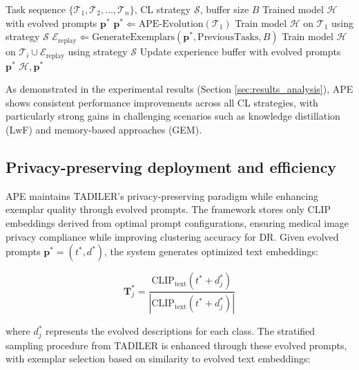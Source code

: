 \documentclass[pdflatex,sn-mathphys-num]{sn-jnl}%
\theoremstyle{thmstyleone}%
\theoremstyle{thmstyletwo}%
\theoremstyle{thmstylethree}%
\begin{document}
\begin{algorithm}
\caption{APE-Enhanced CL Integration}\label{alg:ape_continual_learning}
\begin{algorithmic}[1]
\Require Task sequence $\{\mathcal{T}_1, \mathcal{T}_2, \ldots, \mathcal{T}_n\}$, CL strategy $\mathcal{S}$, buffer size $B$
\Ensure Trained model $\mathcal{H}$ with evolved prompts $\mathbf{p}^*$
\State $\mathbf{p}^* \Leftarrow \text{APE-Evolution}(\mathcal{T}_1)$ 
        \State Train model $\mathcal{H}$ on $\mathcal{T}_1$ using strategy $\mathcal{S}$
    \Else
        \State $\mathcal{E}_{\text{replay}} \Leftarrow \text{GenerateExemplars}(\mathbf{p}^*, \text{PreviousTasks}, B)$
        \State Train model $\mathcal{H}$ on $\mathcal{T}_i \cup \mathcal{E}_{\text{replay}}$ using strategy $\mathcal{S}$
    \EndIf
    \State Update experience buffer with evolved prompts $\mathbf{p}^*$
\EndFor
\State \Return $\mathcal{H}, \mathbf{p}^*$
\end{algorithmic}
\end{algorithm}

As demonstrated in the experimental results (Section \ref{sec:results_analysis}), APE shows consistent performance improvements across all CL strategies, with particularly strong gains in challenging scenarios such as knowledge distillation (LwF) and memory-based approaches (GEM).

\subsection{Privacy-preserving deployment and efficiency}
APE maintains TADILER's privacy-preserving paradigm while enhancing exemplar quality through evolved prompts. The framework stores only CLIP embeddings derived from optimal prompt configurations, ensuring medical image privacy compliance while improving clustering accuracy for DR. Given evolved prompts $\mathbf{p}^* = (t^*, d^*)$, the system generates optimized text embeddings:

\begin{equation}
\mathbf{T}^*_j = \frac{\text{CLIP}_{\text{text}}(t^* + d^*_j)}{|\text{CLIP}_{\text{text}}(t^* + d^*_j)|}
\end{equation}

where $d^*_j$ represents the evolved descriptions for each class. The stratified sampling procedure from TADILER is enhanced through these evolved prompts, with exemplar selection based on similarity to evolved text embeddings:
\end{document}
